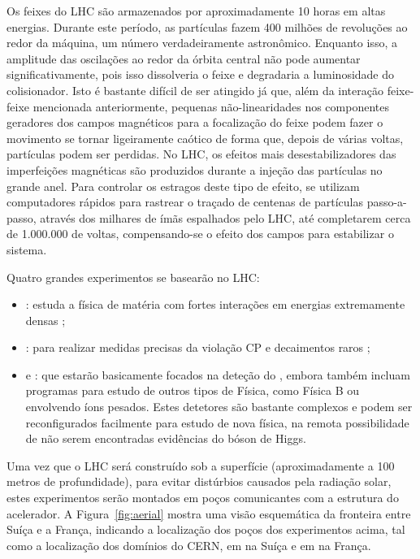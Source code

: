 Os feixes do LHC são armazenados por aproximadamente 10 horas em altas
energias. Durante este período, as partículas fazem 400 milhões de revoluções
ao redor da máquina, um número verdadeiramente astronômico. Enquanto isso, a
amplitude das oscilações ao redor da órbita central não pode aumentar
significativamente, pois isso dissolveria o feixe e degradaria a luminosidade
do colisionador. Isto é bastante difícil de ser atingido já que, além da
interação feixe-feixe mencionada anteriormente, pequenas não-linearidades nos
componentes geradores dos campos magnéticos para a focalização do feixe podem
fazer o movimento se tornar ligeiramente caótico de forma que, depois de
várias voltas, partículas podem ser perdidas. No LHC, os efeitos mais
desestabilizadores das imperfeições magnéticas são produzidos durante a
injeção das partículas no grande anel. Para controlar os estragos deste tipo
de efeito, se utilizam computadores rápidos para rastrear o traçado de
centenas de partículas passo-a-passo, através dos milhares de ímãs
espalhados pelo LHC, até completarem cerca de 1.000.000 de voltas,
compensando-se o efeito dos campos para estabilizar o sistema.

Quatro grandes experimentos se basearão no LHC:

\begin{itemize}

\item {}: estuda a física de matéria com fortes interações
em energias extremamente densas \cite{alice};

\item {}: para realizar medidas precisas da violação CP e
decaimentos raros \cite{lhcb};

\item {} \cite{atlas-site} e  \cite{cms}:
que estarão basicamente focados na deteção do , embora
também incluam programas para estudo de outros tipos de Física, como Física B
ou envolvendo íons pesados. Estes detetores são bastante complexos e podem ser
reconfigurados facilmente para estudo de nova física, na remota possibilidade
de não serem encontradas evidências do bóson de Higgs.

\end{itemize}

Uma vez que o LHC será construído sob a superfície (aproximadamente a 100
metros de profundidade), para evitar distúrbios causados pela radiação solar,
estes experimentos serão montados em poços comunicantes com a estrutura do
acelerador. A Figura~\ref{fig:aerial} mostra uma visão esquemática da
fronteira entre Suíça e a França, indicando a localização dos poços dos
experimentos acima, tal como a localização dos domínios do CERN, em
 na Suíça e em  na França.

